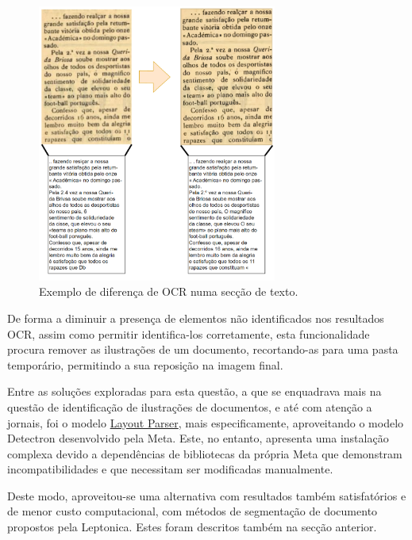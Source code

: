 \begin{figure}[H]
	\centering
	\includegraphics[width=0.7\textwidth]{images/ilustracoes/upscaling_example.png}
	\caption{Exemplo de diferença de OCR numa secção de texto.}
	\label{fig:upscaling_example}
\end{figure}



De forma a diminuir a presença de elementos não identificados nos resultados OCR, assim como permitir identifica-los corretamente, esta funcionalidade procura remover as ilustrações de um documento, recortando-as para uma pasta temporário, permitindo a sua reposição na imagem final.

Entre as soluções exploradas para esta questão, a que se enquadrava mais na questão de identificação de ilustrações de documentos, e até com atenção a jornais, foi o modelo \href{https://layout-parser.readthedocs.io/en/latest/index.html}{Layout Parser}, mais especificamente, aproveitando o modelo Detectron desenvolvido pela Meta.
Este, no entanto, apresenta uma instalação complexa devido a dependências de bibliotecas da própria Meta que demonstram incompatibilidades e que necessitam ser modificadas manualmente.

Deste modo, aproveitou-se uma alternativa com resultados também satisfatórios e de menor custo computacional, com métodos de segmentação de documento propostos pela Leptonica. Estes foram descritos também na secção anterior.


